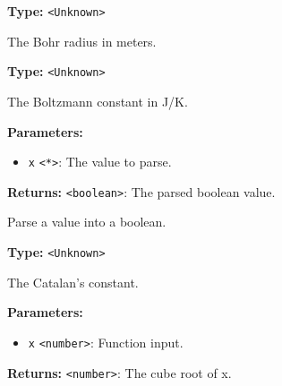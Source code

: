 \documentclass[12pt,a4paper]{article}
\begin{document}
\vspace{5mm}
\noindent {}\vspace{4mm}


\noindent \textbf{Type:} \texttt{<Unknown>}

\noindent The Bohr radius in meters.

\vspace{5mm}
\noindent {}\vspace{4mm}


\noindent \textbf{Type:} \texttt{<Unknown>}

\noindent The Boltzmann constant in \textasciigrave{}J/K\textasciigrave{}.

\vspace{5mm}
\noindent {}


\noindent \textbf{Parameters:}
\begin{itemize}
  \item \texttt{x} \texttt{<*>}: The value to parse.
\end{itemize}

\noindent \textbf{Returns:} \texttt{<boolean>}: The parsed boolean value.

\noindent Parse a value into a boolean.

\vspace{5mm}
\noindent {}\vspace{4mm}


\noindent \textbf{Type:} \texttt{<Unknown>}

\noindent The Catalan's constant.

\vspace{5mm}
\noindent {}


\noindent \textbf{Parameters:}
\begin{itemize}
  \item \texttt{x} \texttt{<number>}: Function input.
\end{itemize}

\noindent \textbf{Returns:} \texttt{<number>}: The cube root of \textasciigrave{}x\textasciigrave{}.
\end{document}

